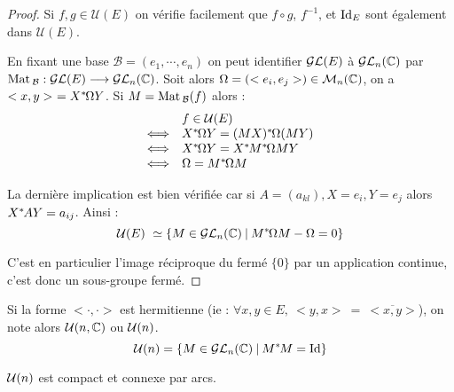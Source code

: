 \begin{proof}
Si $f,g \in \mathcal{U}(E)$ on vérifie facilement que $f\circ g$, $f^{-1}$, et
$\operatorname{Id}_E$ sont également dans $\mathcal{U}(E)$.

En fixant une base $\mathcal{B} = (e_1, \cdots, e_n)$ on peut identifier
$\mathcal{GL}(E)$ à $\mathcal{GL}_n(\mathbb{C})$ par $\operatorname{Mat\,}_{\mathcal{B}} : \mathcal{GL}(E)\longrightarrow
\mathcal{GL}_n(\mathbb{C})$. Soit alors $\Omega = (<e_i,e_j>) \in \mathcal{M}_n(\mathbb{C})$, on a $<x,y>\ =
X^{*}\hspace{-0.1em}\Omega Y$. Si $M = \operatorname{Mat\,}_\mathcal{B}(f)$ alors :
\begin{displaymath}\begin{array}{rl}
                    & f\in \mathcal{U}(E) \\
\Longleftrightarrow & X^{*}\hspace{-0.1em}\Omega Y = (MX)^{*}\hspace{-0.1em}\Omega(MY) \\
\Longleftrightarrow & X^{*}\hspace{-0.1em}\Omega Y = X^{*}\hspace{-0.1em}M^{*}\hspace{-0.1em} \Omega MY \\
\Longleftrightarrow & \Omega = M^{*}\hspace{-0.1em}\Omega M \\
  \end{array}
\end{displaymath}

La dernière implication est bien vérifiée car si $A=(a_{kl}), X=e_i, Y=e_j$
alors $X^{*}\hspace{-0.1em}AY = a_{ij}$. Ainsi :
\begin{displaymath}\mathcal{U}(E) \simeq \{M\in \GL_n(\C) \tq M\*\Omega M -
\Omega = 0\} \end{displaymath}

C'est en particulier l'image réciproque du fermé $\{0\}$ par un application
continue, c'est donc un sous-groupe fermé.
\end{proof}

\begin{defiprop}

Si la forme $<\cdotp,\cdotp>$ est hermitienne (ie : $\forall x,y \in E,\
<y,x>\ =\ \overline{<x,y>}$), on note alors $\mathcal{U}(n,\mathbb{C})$ ou $\mathcal{U}(n)$.
\begin{displaymath} \mathcal{U}(n) = \{ M \in \mathcal{GL}_n(\mathbb{C}) \: | \: M^{*}\hspace{-0.1em}M = \operatorname{Id}\}
\end{displaymath}
\end{defiprop}

\begin{prop}
 
$\mathcal{U}(n)$ est compact et connexe par arcs.
\end{prop}

